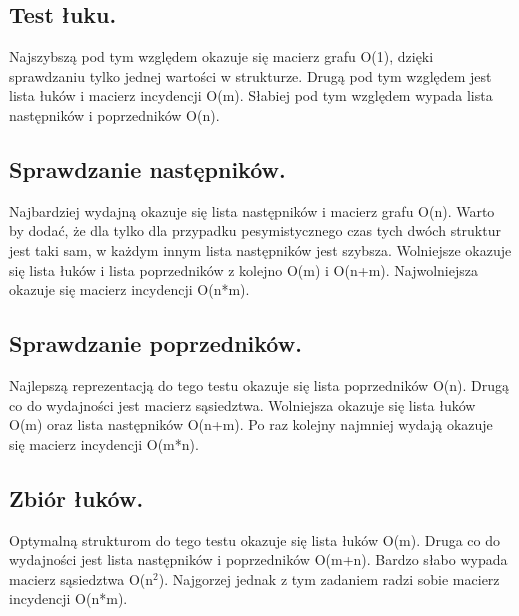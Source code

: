 \documentclass[polish,polish,a4paper]{article}
\begin{document}
\subsection{Test łuku.}
Najszybszą pod tym względem okazuje się macierz grafu O(1), dzięki sprawdzaniu tylko jednej wartości w strukturze. Drugą pod tym względem jest lista łuków i macierz incydencji O(m). Słabiej pod tym względem wypada lista następników i poprzedników O(n). 

\subsection{Sprawdzanie następników.}
Najbardziej wydajną okazuje się lista następników i macierz grafu O(n). Warto by dodać, że dla tylko dla przypadku pesymistycznego czas tych dwóch struktur jest taki sam, w każdym innym lista następników jest szybsza. Wolniejsze okazuje się lista łuków i lista poprzedników z kolejno O(m) i O(n+m). Najwolniejsza okazuje się macierz incydencji O(n*m).

\subsection{Sprawdzanie poprzedników.}
Najlepszą reprezentacją do tego testu okazuje się lista poprzedników O(n). Drugą co do wydajności jest macierz sąsiedztwa. Wolniejsza okazuje się lista łuków O(m) oraz lista następników O(n+m). Po raz kolejny najmniej wydają okazuje się macierz incydencji O(m*n).

\subsection{Zbiór łuków.}
Optymalną strukturom do tego testu okazuje się lista łuków O(m).  Druga co do  wydajności jest lista następników i poprzedników O(m+n). Bardzo słabo wypada macierz sąsiedztwa O(n$^2$). Najgorzej jednak z tym zadaniem radzi sobie macierz incydencji O(n*m).
	\newpage
	\tableofcontents
\end{document}

